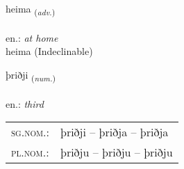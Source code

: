 \documentclass[frontgrid, backgrid]{flacards}\usepackage[]{graphicx}\usepackage[]{xcolor}
\begin{document}

\renewcommand{\flhead}{\vskip5pt \fboxsep=0pt {\small\bfseries\footnotesize Atviksorð | Adverb}}
\renewcommand{\fcfoot}{\vskip5pt \fboxsep=0pt \hspace{2pt}{\small\bfseries\footnotesize 1K}}

\renewcommand{\blhead}{\vskip5pt {\small\bfseries\footnotesize Atviksorð | Adverb }}
\renewcommand{\bcfoot}{\vskip5pt \hspace{2pt}{\small\bfseries\footnotesize 1K}}


{heima \small{\textsubscript{(\textit{adv.})}} \\[1ex]
\textphonetic{[heiːma]} \\
en.: \emph{at home} \\  [2ex]
heima (Indeclinable)}

\renewcommand{\flhead}{\vskip5pt \fboxsep=0pt {\small\bfseries\footnotesize Töluorð | Numeral}}
\renewcommand{\fcfoot}{\vskip5pt \fboxsep=0pt \hspace{2pt}{\small\bfseries\footnotesize 1K}}

\renewcommand{\blhead}{\vskip5pt {\small\bfseries\footnotesize Töluorð | Numeral }}
\renewcommand{\bcfoot}{\vskip5pt \hspace{2pt}{\small\bfseries\footnotesize 1K}}


{þriðji \small{\textsubscript{(\textit{num.})}} \\[1ex] %
\textphonetic{[θrɪðjɪ]} \\
en.: \emph{third} \\  [2ex]
\renewcommand*{\arraystretch}{0.8}
\begin{tabular}{ll}
\textsc{sg.nom.}: & þriðji  --  þriðja -- þriðja \\ 
\textsc{pl.nom.}: & þriðju -- þriðju -- þriðju
\end{tabular}
}

\renewcommand{\flhead}{\vskip5pt \fboxsep=0pt {\small\bfseries\footnotesize Nafnorð | Noun}}
\renewcommand{\fcfoot}{\vskip5pt \fboxsep=0pt \hspace{2pt}{\small\bfseries\footnotesize 1K}}
\end{document}
